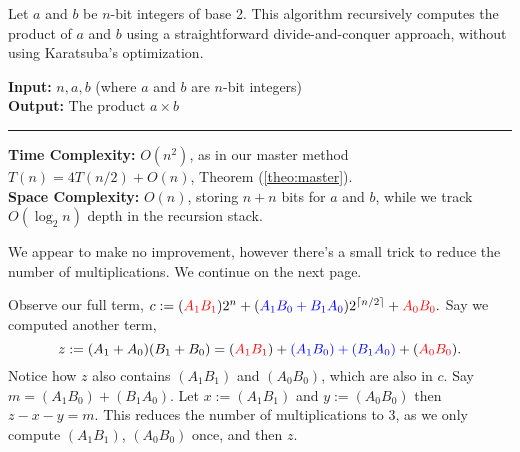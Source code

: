 \begin{Func}
    Let $a$ and $b$ be $n$-bit integers of base 2. This algorithm recursively computes the product of $a$ and $b$ using a straightforward divide-and-conquer approach, without using Karatsuba's optimization.

    \vspace{.5em}
    \noindent
    \textbf{Input:} $n, a, b$ (where $a$ and $b$ are $n$-bit integers)\\
    \textbf{Output:} The product $a \times b$\\

    \begin{algorithm}[H]
        \SetAlgoLined
    \end{algorithm}
    \noindent\rule{\textwidth}{0.4pt}

    \noindent
    \textbf{Time Complexity:} $O(n^2)$, as in our master method $T(n)=4T(n/2)+O(n)$, Theorem (\ref{theo:master}).\\
    \textbf{Space Complexity:} $O(n)$, storing $n+n$ bits for $a$ and $b$, while we track $O(\log_2 n)$ depth in the recursion stack.
\end{Func}
\noindent
We appear to make no improvement, however there's a small trick to reduce the number of multiplications. We continue on the next page.

\newpage

\label{page:karatsuba}
\noindent
Observe our full term, $c:=(\textcolor{red}{A_1B_1})2^{n}+(\textcolor{blue}{A_1B_0+B_1A_0})2^{\lceil n/2\rceil}+\textcolor{red}{A_0B_0}.$ Say we computed another term,
\[z:=(A_1+A_0)(B_1+B_0)=(\textcolor{red}{A_1B_1})+\textcolor{blue}{(A_1B_0)+(B_1A_0)}+(\textcolor{red}{A_0B_0}).\]
\noindent
Notice how $z$ also contains $(A_1B_1)$ and $(A_0B_0)$, which are also in $c$. Say
$m=(A_1B_0)+(B_1A_0)$. Let $x:=(A_1B_1)$ and $y:=(A_0B_0)$ then $z-x-y=m$. This reduces the number of multiplications to 3, as we only compute
 $(A_1B_1)$, $(A_0B_0)$ once, and then $z$.\\

